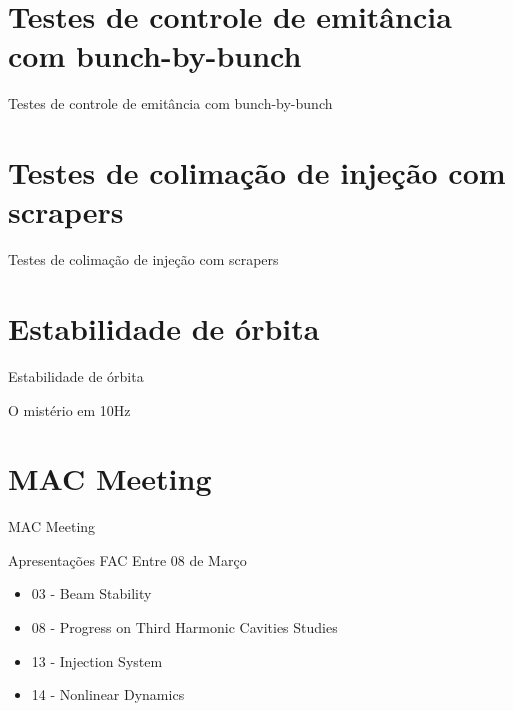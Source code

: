 \documentclass[1610]{beamer}					  %
\begin{document}
\section{Testes de controle de emitância com bunch-by-bunch}

\begin{frame}
    \Huge{Testes de controle de emitância com bunch-by-bunch}
\end{frame}

\section{Testes de colimação de injeção com scrapers}

\begin{frame}
    \Huge{Testes de colimação de injeção com scrapers}
\end{frame}

\section{Estabilidade de órbita}

\begin{frame}
    \Huge{Estabilidade de órbita}
\end{frame}

\begin{frame}{O mistério em 10Hz}
    
\end{frame}

\section{MAC Meeting}

\begin{frame}
    \Huge{MAC Meeting}
\end{frame}

\begin{frame}{Apresentações FAC}
Entre 08 de Março
    \begin{itemize}
        \item 03 - Beam Stability
        \item 08 - Progress on Third Harmonic Cavities Studies
        \item 13 - Injection System
        \item 14 - Nonlinear Dynamics
    \end{itemize}
\end{frame}
\end{document}
